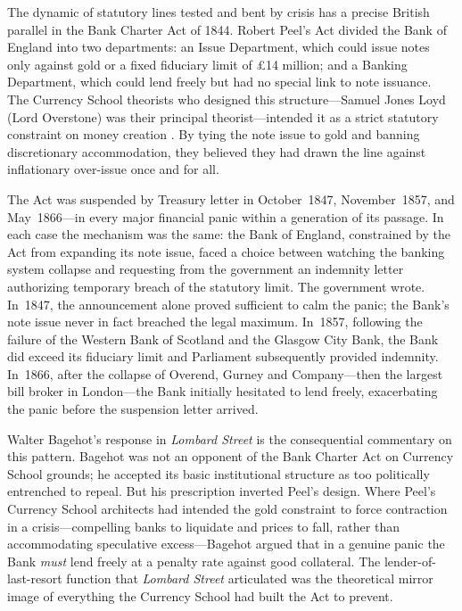 \documentclass[12pt]{article}
\begin{document}
The dynamic of statutory lines tested and bent by crisis has a precise
British parallel in the Bank Charter Act of 1844.  Robert Peel's Act
divided the Bank of England into two departments: an Issue Department,
which could issue notes only against gold or a fixed fiduciary limit of
\pounds 14 million; and a Banking Department, which could lend freely
but had no special link to note issuance.  The Currency School theorists
who designed this structure---Samuel Jones Loyd (Lord Overstone) was
their principal theorist---intended it as a strict statutory
constraint on money creation \citep{Fetter1965}.  By tying the note
issue to gold and banning discretionary accommodation, they believed they
had drawn the line against inflationary over-issue once and for all.

The Act was suspended by Treasury letter in October~1847,
November~1857, and May~1866---in every major financial panic within a
generation of its passage.  In each case the mechanism was the same:
the Bank of England, constrained by the Act from expanding its note
issue, faced a choice between watching the banking system collapse and
requesting from the government an indemnity letter authorizing temporary
breach of the statutory limit.  The government wrote.  In~1847, the
announcement alone proved sufficient to calm the panic; the Bank's note
issue never in fact breached the legal maximum.  In~1857, following the
failure of the Western Bank of Scotland and the Glasgow City Bank, the
Bank did exceed its fiduciary limit and Parliament subsequently provided
indemnity.  In~1866, after the collapse of Overend, Gurney
and Company---then the largest bill broker in London---the Bank
initially hesitated to lend freely, exacerbating the panic before the
suspension letter arrived.

Walter Bagehot's response in \textit{Lombard Street} \citep{Bagehot1873}
is the consequential commentary on this
pattern.  Bagehot was not an opponent of the Bank Charter Act on
Currency School grounds; he accepted its basic institutional structure
as too politically entrenched to repeal.  But his prescription inverted
Peel's design.  Where Peel's Currency School architects had intended the
gold constraint to force contraction in a crisis---compelling banks to
liquidate and prices to fall, rather than accommodating speculative
excess---Bagehot argued that in a genuine panic the Bank \emph{must}
lend freely at a penalty rate against good collateral.  The lender-of-
last-resort function that \textit{Lombard Street} articulated was the
theoretical mirror image of everything the Currency School had built the
Act to prevent.
\end{document}
